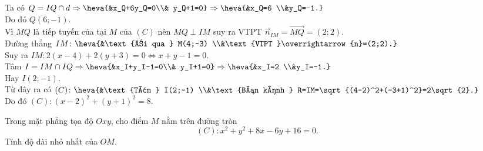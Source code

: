 \begin{bt}
{		Ta có $Q=IQ \cap d \Rightarrow \heva{&x_Q+6y_Q=0\\& y_Q+1=0} \Rightarrow \heva{&x_Q=6 \\&y_Q=-1.}$\\
		Do đó $Q(6;-1)$.\\
		Vì $MQ$ là tiếp tuyến của tại $M$ của $(C)$ nên $MQ \perp IM$ suy ra VTPT $\overrightarrow{n}_{IM}=\overrightarrow{MQ}=(2;2)$.\\
		Đường thẳng $IM\colon \heva{&\text{đi qua } M(4;-3) \\&\text{VTPT }\overrightarrow{n}=(2;2).}$\\
		Suy ra $IM\colon 2(x-4)+2(y+3)=0 \Leftrightarrow x+y-1=0$.\\
		Tâm $I=IM \cap IQ \Rightarrow \heva{&x_I+y_I-1=0\\& y_I+1=0} \Rightarrow \heva{&x_I=2 \\&y_I=-1.}$\\
		Hay $I(2;-1)$.\\
		Từ đây ra có $(C)\colon \heva{&\text{Tâm } I(2;-1) \\&\text{Bán kính } R=IM=\sqrt{(4-2)^2+(-3+1)^2}=2\sqrt{2}.}$\\
		Do đó $(C)\colon (x-2)^2+(y+1)^2=8$.
	}
\end{bt}

\begin{bt}%
	Trong mặt phẳng tọa độ $Oxy$, cho điểm $M$ nằm trên đường tròn \[(C)\colon x^2+y^2+8x-6y+16=0.\] Tính độ dài nhỏ nhất của $OM$.
\end{bt}

